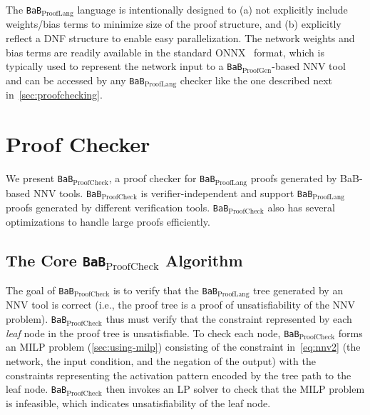 \documentclass[oneside,11pt,dvipsnames]{book}
\numberwithin{equation}{section}
\theoremstyle{definition}
\theoremstyle{remark}
\newcommand{\proofgen}{\texttt{BaB$_{\text{ProofGen}}$}}
\newcommand{\prooflang}{\texttt{BaB$_{\text{ProofLang}}$}}
\newcommand{\proofcheck}{\texttt{BaB$_{\text{ProofCheck}}$}}
\newcommand{\unsat}{\texttt{unsat}}
\begin{document}
The \prooflang{} language is intentionally designed to (a) not explicitly include weights/bias terms to minimize size of the proof structure, and (b) explicitly reflect a DNF structure to enable easy parallelization.
The network weights and bias terms are readily available in the standard ONNX~\cite{onnx} format, which is typically used to represent the network input to a \proofgen{}-based NNV tool and can be accessed by any \prooflang{} checker like the one described next in~\autoref{sec:proofchecking}.


\section{Proof Checker}\label{sec:proofchecking}
We present \proofcheck{}, a proof checker for \prooflang{} proofs generated by BaB-based NNV tools.
\proofcheck{} is verifier-independent and support \prooflang{} proofs generated by different verification tools. \proofcheck{} also has several optimizations to handle large proofs efficiently.

\subsection{The Core \proofcheck{} Algorithm}

The goal of \proofcheck{} is to verify that the \prooflang{} tree generated by an NNV tool is correct (i.e., the proof tree is a proof of unsatisfiability of the NNV problem).
\proofcheck{} thus must verify that the constraint represented by each \emph{leaf} node in the proof tree is unsatisfiable. To check each node, \proofcheck{} forms an MILP problem (\autoref{sec:using-milp}) consisting of the constraint in~\autoref{eq:nnv2} (the network, the input condition, and the negation of the output) with the constraints representing the activation pattern encoded by the tree path to the leaf node. \proofcheck{} then invokes an LP solver to check that the MILP problem is infeasible, which indicates unsatisfiability of the leaf node.
\end{document}
